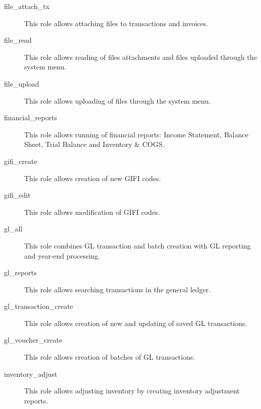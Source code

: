 \begin{description}
\item [file\_attach\_tx] \htmlspacing 
                         This role allows attaching files to transactions and invoices.
\item [file\_read] \htmlspacing 
                         This role allows reading of files attachments and files uploaded through the system menu.
\item [file\_upload] \htmlspacing 
                         This role allows uploading of files through the system menu.
\item [financial\_reports] \htmlspacing 
                         This role allows running of financial reports:
                         Income Statement, Balance Sheet, Trial Balance and
                         Inventory \& COGS.
\item [gifi\_create] \htmlspacing 
                         This role allows creation of new GIFI codes.
\item [gifi\_edit] \htmlspacing 
                         This role allows modification of GIFI codes.
\item [gl\_all] \htmlspacing 
                         This role combines \gls{GL}  transaction and batch creation
                         with \gls{GL}  reporting and year-end processing.
\item [gl\_reports] \htmlspacing 
                         This role allows searching transactions in the general ledger.
\item [gl\_transaction\_create] \htmlspacing 
                         This role allows creation of new and updating of saved \gls{GL}  transactions.
\item [gl\_voucher\_create] \htmlspacing 
                         This role allows creation of batches of \gls{GL}  transactions.
\item [inventory\_adjust] \htmlspacing 
                         This role allows adjusting inventory by creating inventory adjustment reports.

\end{description}
